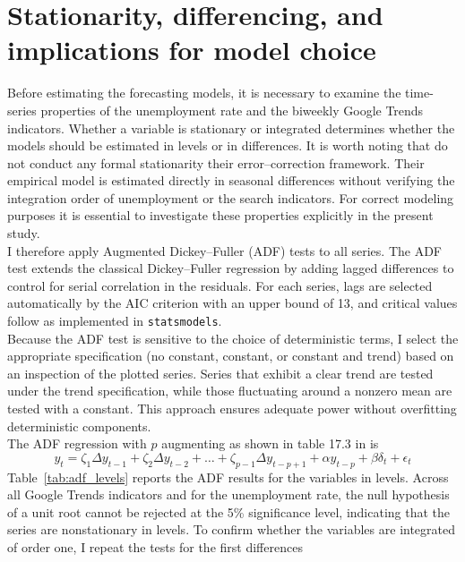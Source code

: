 \documentclass[12pt,a4paper]{article}
\begin{document}
\section{Stationarity, differencing, and implications for model choice}
Before estimating the forecasting models, it is necessary to examine the 
time-series properties of the unemployment rate and the biweekly Google Trends 
indicators. Whether a variable is stationary or integrated determines whether the 
models should be estimated in levels or in differences.
It is worth noting that 
\citet{Askitas} do not conduct any formal 
stationarity their error–correction 
framework. Their empirical model is estimated directly in seasonal differences without verifying 
the integration order of unemployment or the search indicators. For correct modeling purposes it is essential to investigate these properties explicitly in the present 
study.\\
I therefore apply 
Augmented Dickey--Fuller (ADF) tests to all series.
The ADF test extends the classical Dickey--Fuller regression by adding lagged 
differences to control for serial correlation in the residuals. For each series, 
lags are selected automatically by the AIC criterion with an upper bound of 13, and 
critical values follow \citet{mckinnon} as implemented in \texttt{statsmodels}.\\
Because the ADF test is sensitive to the choice of deterministic terms, I select the 
appropriate specification (no constant, constant, or constant and trend) based on an 
inspection of the plotted series. Series that exhibit a clear trend are tested under 
the trend specification, while those fluctuating around a nonzero mean are tested 
with a constant. This approach ensures adequate power without overfitting 
deterministic components.
\\
The ADF regression with $p$ augmenting as shown in table 17.3 in \citet{hamilton} is
\begin{equation}
y_t = \zeta_1 \Delta y_{t-1} + \zeta_2 \Delta y_{t-2} + \dots + \zeta_{p-1} \Delta y_{t-p+1} + \alpha y_{t-p} + \beta \delta_t + \epsilon_t
\label{eq:adf}
\end{equation}
Table~\ref{tab:adf_levels} reports the ADF results for the variables in levels. 
Across all Google Trends indicators and for the unemployment rate, the null 
hypothesis of a unit root cannot be rejected at the 5\% significance level, 
indicating that the series are nonstationary in levels. To confirm whether the 
variables are integrated of order one, I repeat the tests for the first differences 
\end{document}
